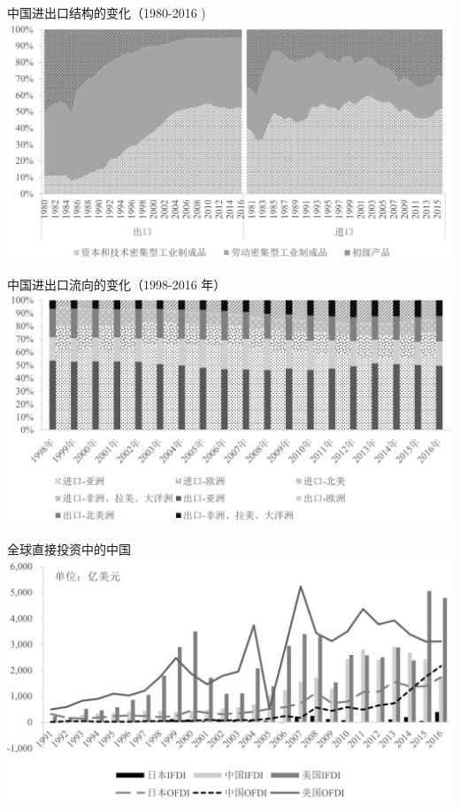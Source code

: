 \documentclass[10pt,hyperref={CJKbookmarks=true},xcolor=dvipsnames,aspectratio=169]{beamer}
\begin{document}
\begin{frame}{中国进出口结构的变化（1980-2016 )}
\centering \includegraphics[scale=0.4]{fig/gravity/china2}

\end{frame}

\begin{frame}{中国进出口流向的变化（1998-2016 年）}
\centering \includegraphics[scale=0.55]{fig/gravity/china3}
\end{frame}

\begin{frame}{全球直接投资中的中国}
\centering \includegraphics[scale=0.5]{fig/gravity/china4}
\end{frame}
\end{document}
